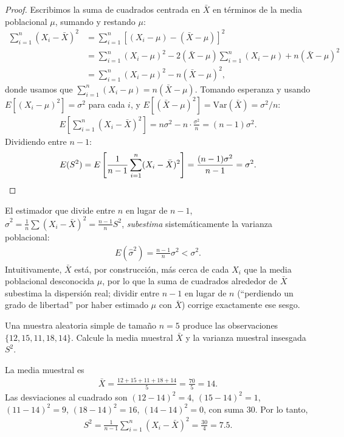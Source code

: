 \begin{proof}
Escribimos la suma de cuadrados centrada en $\bar{X}$ en t\'erminos de la media
poblacional $\mu$, sumando y restando $\mu$:
\begin{align}
 \sum_{i=1}^n (X_i - \bar{X})^2
 &= \sum_{i=1}^n \left[(X_i - \mu) - (\bar{X} - \mu)\right]^2 \\
 &= \sum_{i=1}^n (X_i - \mu)^2 - 2(\bar{X}-\mu)\sum_{i=1}^n(X_i-\mu) + n(\bar{X}-\mu)^2 \\
 &= \sum_{i=1}^n (X_i - \mu)^2 - n(\bar{X}-\mu)^2,
\end{align}
donde usamos que $\sum_{i=1}^n (X_i - \mu) = n(\bar{X}-\mu)$. Tomando esperanza y
usando $E[(X_i-\mu)^2] = \sigma^2$ para cada $i$, y
$E[(\bar{X}-\mu)^2] = \text{Var}(\bar{X}) = \sigma^2/n$:
\begin{align}
 E\left[\sum_{i=1}^n (X_i - \bar{X})^2\right] = n\sigma^2 - n\cdot\frac{\sigma^2}{n}
 = (n-1)\sigma^2.
\end{align}
Dividiendo entre $n-1$:
\begin{align}
 E(S^2) = E\left[\frac{1}{n-1}\sum_{i=1}^n (X_i - \bar{X})^2\right]
 = \frac{(n-1)\sigma^2}{n-1} = \sigma^2. \qedhere
\end{align}
\end{proof}

\begin{observacion}
El estimador que divide entre $n$ en lugar de $n-1$, $\hat{\sigma}^2 =
\frac{1}{n}\sum(X_i-\bar{X})^2 = \frac{n-1}{n}S^2$, \emph{subestima}
sistem\'aticamente la varianza poblacional:
\begin{align}
 E(\hat{\sigma}^2) = \frac{n-1}{n}\sigma^2 < \sigma^2.
\end{align}
Intuitivamente, $\bar{X}$ est\'a, por construcci\'on, m\'as cerca de cada $X_i$ que la
media poblacional desconocida $\mu$, por lo que la suma de cuadrados alrededor de
$\bar{X}$ subestima la dispersi\'on real; dividir entre $n-1$ en lugar de $n$
(``perdiendo un grado de libertad'' por haber estimado $\mu$ con $\bar{X}$) corrige
exactamente ese sesgo.
\end{observacion}

\begin{ejemplo}
 \label{exmp:5.1.1}
Una muestra aleatoria simple de tama\~no $n=5$ produce las observaciones
$\{12, 15, 11, 18, 14\}$. Calcule la media muestral $\bar{X}$ y la varianza muestral
insesgada $S^2$.
\end{ejemplo}

\begin{solucion}
La media muestral es
\begin{align}
 \bar{X} = \frac{12+15+11+18+14}{5} = \frac{70}{5} = 14.
\end{align}
Las desviaciones al cuadrado son $(12-14)^2=4$, $(15-14)^2=1$, $(11-14)^2=9$,
$(18-14)^2=16$, $(14-14)^2=0$, con suma $30$. Por lo tanto,
\begin{align}
 S^2 = \frac{1}{n-1}\sum_{i=1}^n (X_i-\bar{X})^2 = \frac{30}{4} = 7.5.
\end{align}
\end{solucion}



